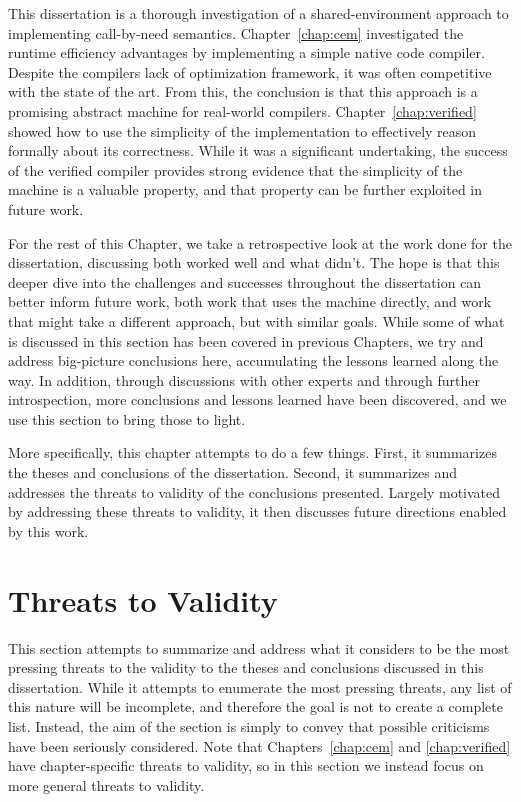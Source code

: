 This dissertation is a thorough investigation of a shared-environment approach
to implementing call-by-need semantics. Chapter~\ref{chap:cem} investigated the
runtime efficiency advantages by implementing a simple native code compiler.
Despite the compilers lack of optimization framework, it was often competitive
with the state of the art. From this, the conclusion is that this approach is a
promising abstract machine for real-world compilers. Chapter~\ref{chap:verified}
showed how to use the simplicity of the implementation to effectively reason
formally about its correctness. While it was a significant undertaking, the
success of the verified compiler provides strong evidence that the simplicity of
the machine is a valuable property, and that property can be further exploited
in future work.

For the rest of this Chapter, we take a retrospective look at the work done for
the dissertation, discussing both worked well and what didn't. The hope is that
this deeper dive into the challenges and successes throughout the dissertation
can better inform future work, both work that uses the \ce machine directly, and
work that might take a different approach, but with similar goals. While some of
what is discussed in this section has been covered in previous Chapters, we try
and address big-picture conclusions here, accumulating the lessons learned along
the way. In addition, through discussions with other experts and through further
introspection, more conclusions and lessons learned have been discovered, and we
use this section to bring those to light. 

More specifically, this chapter attempts to do a few things. First, it
summarizes the theses and conclusions of the dissertation. Second, it summarizes
and addresses the threats to validity of the conclusions presented.  Largely
motivated by addressing these threats to validity, it then discusses future
directions enabled by this work. 

\section{Threats to Validity}

This section attempts to summarize and address what it considers to be the most
pressing threats to the validity to the theses and conclusions discussed in this
dissertation. While it attempts to enumerate the most pressing threats, any list
of this nature will be incomplete, and therefore the goal is not to create a
complete list. Instead, the aim of the section is simply to convey that possible
criticisms have been seriously considered. Note that Chapters~\ref{chap:cem} and
\ref{chap:verified} have chapter-specific threats to validity, so in this
section we instead focus on more general threats to validity. 


